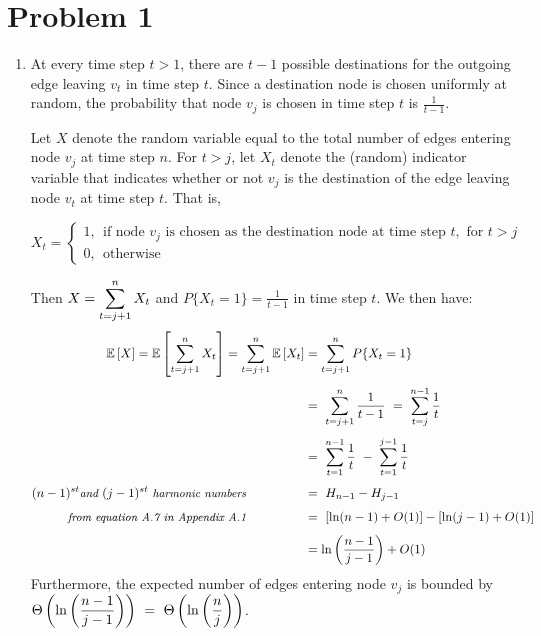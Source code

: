 \documentclass[twoside,11pt]{homework}
\date{\today}
\begin{document}
\maketitle

\section*{Problem 1}

\begin{enumerate}[\bf (a)]

\item At every time step $t > 1$,  there are $t-1$ possible destinations for the outgoing edge leaving $v_t$ in time step $t$.  Since a destination node is chosen uniformly at random,  the probability that node $v_j$ is chosen in time step $t$ is $\frac{1}{t-1}$.  

Let $X$ denote the random variable equal to the total number of edges entering node $v_j$ at time step $n$.  For $t > j$,  let $X_t$ denote the (random) indicator variable that indicates whether or not $v_j$ is the destination of the edge leaving node $v_t$ at time step $t$.  That is, 

$X_t = 
\begin{cases}
1  ,  \ \ \textrm{if node } v_j \textrm{ is chosen as the destination node at time step }  t,  \textrm{  for }  t>j \\
0 ,  \ \ \textrm{otherwise}
\end{cases}
$

Then $\mathlarger{X = \sum_{t = j+1}^n X_t}$  and  $P\{X_t = 1\}  = \frac{1}{t-1}$ in time step $t$.  We then have: 
\begin{align*}
\mathbb{E}\left[ X \right]  = \mathbb{E}\left[ \sum_{t=j+1}^{n} X_t \right] = \sum_{t=j+1}^{n} \mathbb{E}\left[X_t\right]  &=  \sum_{t=j+1}^{n} P\{X_t = 1\} \\[0.4em]
& = \  \sum_{t=j+1}^{n} \frac{1}{t-1} \ = \ \sum_{t=j}^{n-1} \frac{1}{t} \\[0.4em]
& = \ \sum_{t=1}^{n-1} \frac{1}{t} \ - \ \sum_{t=1}^{j-1} \frac{1}{t} \\[0.4em]
{\small (n-1)^{st} \textit{\small  and  } (j-1)^{st} \textit{ \small  harmonic numbers}} \ \ \ \ \ \ \ \ \ \ \ \ \ \ & = \ H_{n-1} - H_{j-1} \\[0.4em]
\textit{\small from equation A.7 in Appendix A.1} \ \ \ \ \ \ \ \ \ \ \ \ \ \ & = \ \left[\ln(n-1) + O(1)\right]  -  \left[\ln(j-1) + O(1)\right] \\[0.4em]
& = \ln\left(\frac{n-1}{j-1}\right) + O(1)
\end{align*}
Furthermore,  the expected number of edges entering node $v_j$ is bounded by \\[0.3em]
 $\mathlarger{\Theta\left(\ln\left(\frac{n-1}{j-1}\right)\right) \ = \ \Theta\left(\ln\left(\frac{n}{j}\right)\right)}$.



\end{enumerate}
\end{document}
